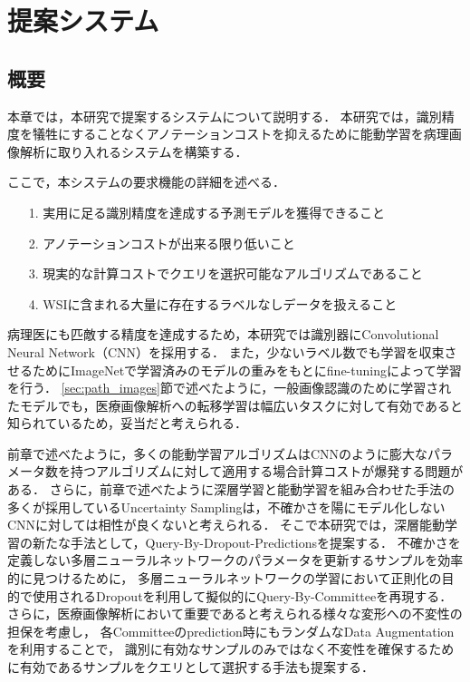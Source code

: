 \chapter{提案システム}

\section{概要}
本章では，本研究で提案するシステムについて説明する．
本研究では，識別精度を犠牲にすることなくアノテーションコストを抑えるために能動学習を病理画像解析に取り入れるシステムを構築する．

ここで，本システムの要求機能の詳細を述べる．
\begin{itemize}
    \item[1.] 実用に足る識別精度を達成する予測モデルを獲得できること
    \item[2.] アノテーションコストが出来る限り低いこと
    \item[3.] 現実的な計算コストでクエリを選択可能なアルゴリズムであること
    \item[4.] WSIに含まれる大量に存在するラベルなしデータを扱えること
\end{itemize}

病理医にも匹敵する精度を達成するため，本研究では識別器にConvolutional Neural Network（CNN）を採用する．
また，少ないラベル数でも学習を収束させるためにImageNetで学習済みのモデルの重みをもとにfine-tuningによって学習を行う．
\ref{sec:path_images}節で述べたように，一般画像認識のために学習されたモデルでも，医療画像解析への転移学習は幅広いタスクに対して有効であると知られているため，妥当だと考えられる．

前章で述べたように，多くの能動学習アルゴリズムはCNNのように膨大なパラメータ数を持つアルゴリズムに対して適用する場合計算コストが爆発する問題がある．
さらに，前章で述べたように深層学習と能動学習を組み合わせた手法の多くが採用しているUncertainty Samplingは，不確かさを陽にモデル化しないCNNに対しては相性が良くないと考えられる．
そこで本研究では，深層能動学習の新たな手法として，Query-By-Dropout-Predictionsを提案する．
不確かさを定義しない多層ニューラルネットワークのパラメータを更新するサンプルを効率的に見つけるために，
多層ニューラルネットワークの学習において正則化の目的で使用されるDropoutを利用して擬似的にQuery-By-Committeeを再現する．
さらに，医療画像解析において重要であると考えられる様々な変形への不変性の担保を考慮し，
各Committeeのprediction時にもランダムなData Augmentationを利用することで，
識別に有効なサンプルのみではなく不変性を確保するために有効であるサンプルをクエリとして選択する手法も提案する．

